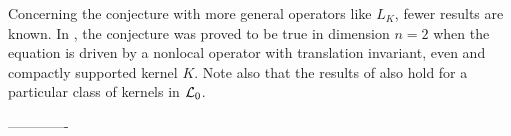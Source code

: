 Concerning the conjecture with more general operators like $L_K$, fewer results are known. In \cite{HamelRosOtonSireValdinoci}, the conjecture was proved to be true in dimension $n=2$ when the equation is driven by a nonlocal operator with translation invariant, even and compactly supported kernel $K$. Note also that the results of \cite{DipierroSerraValdinoci} also hold for a particular class of kernels in $\mathcal{L}_0$.






\bigskip
\bigskip
\bigskip
-------------
\bigskip
\bigskip
\bigskip





